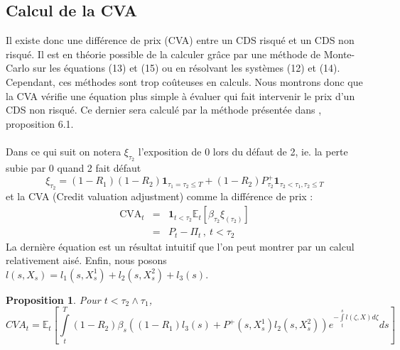 \documentclass[a4paper]{article}
\newtheorem{proposition}[theorem]{Proposition}
\theoremstyle{definition}
\theoremstyle{remark}
\begin{document}
\subsection{Calcul de la CVA}
Il existe donc une différence de prix (CVA) entre un CDS risqué et un CDS non risqué. Il est en théorie possible de la calculer grâce par une méthode de Monte-Carlo sur les équations (13) et (15) ou en résolvant les systèmes (12) et (14). Cependant, ces méthodes sont trop coûteuses en calculs. Nous montrons donc que la CVA vérifie une équation plus simple à évaluer qui fait intervenir le prix d'un CDS non risqué. Ce dernier sera calculé par la méthode présentée dans \cite{A}, proposition 6.1. \\ \\
Dans ce qui suit on notera $\xi_{\tau_2}$ l'exposition de 0 lors du défaut de 2, ie. la perte subie par 0 quand 2 fait défaut
\begin{equation}
\xi_{\tau_2} = (1-R_1)(1-R_2) \mathbf{1}_{\tau_1 = \tau_2 \leq T} + (1 - R_2)P_{\tau_2}^+\mathbf{1}_{\tau_2 < \tau_1, \tau_2 \leq T}
\end{equation}
et la CVA (Credit valuation adjustment) comme la différence de prix :
\begin{eqnarray*}
\text{CVA}_t &=& \mathbf{1}_{t < \tau_2} \mathbb{E}_t \left[ \beta_{\tau_2}\xi_{(\tau_2)} \right] \\
&=&P_t - \Pi_t \, , \ t < \tau_2
\end{eqnarray*}
La dernière équation est un résultat intuitif que l'on peut montrer par un calcul relativement aisé. Enfin, nous posons $l(s, X_s) = l_1(s, X^1_s) + l_2(s, X^2_s) +l_3(s)$.
\begin{proposition}
Pour $t < \tau_2 \wedge \tau_1$,
\begin{equation}
CVA_t = \mathbb{E}_t \left[ \int \limits_t^T (1-R_2)\beta_s\left((1-R_1)l_3(s) + P^+(s, X^1_s)l_2(s,X^2_s)\right)e^{-\int \limits_t^sl(\zeta, X)d\zeta}ds \right]
\end{equation}
\end{proposition}
\end{document}
